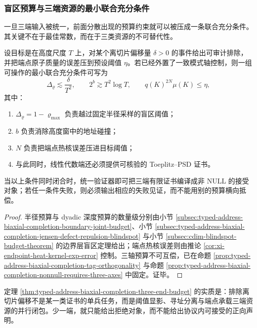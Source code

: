 \subsubsection{盲区预算与三端资源的最小联合充分条件}\label{subsubsec:typed-address-biaxial-completion-three-end-budget}
一旦三端输入被统一，前面分散出现的预算约束就可以被压成一条联合充分条件。其关键不在于最佳常数，而在于三类资源的不可替代性。

\begin{theorem}[三端证书的最小联合充分条件]\label{thm:typed-address-biaxial-completion-three-end-budget}
设目标是在高度尺度 \(T\) 上，对某个离切片偏移量 \(\delta>0\) 的事件给出可审计排除，并把端点原子质量的误差压到预设阈值 \(\eta\)。若已经外置了一致模式轴控制，则一组可操作的最小联合充分条件可写为
\[
\Delta_{\varrho}
\lesssim
\frac{\delta}{T^2},
\qquad
2^b
\gtrsim
T^2\log T,
\qquad
q(K)^{2N}\mu(K)\le \eta,
\]
其中：
\begin{enumerate}
  \item \(\Delta_{\varrho}=1-\varrho_{\max}\) 负责越过固定半径采样的盲区阈值；
  \item \(b\) 负责消除高度窗中的地址碰撞；
  \item \(N\) 负责把端点热核误差压进目标阈值；
  \item 与此同时，线性代数端还必须提供可核验的 Toeplitz--PSD 证书。
\end{enumerate}
当以上条件同时闭合时，统一验证器即可把三端有限证书编译成非 \(\mathrm{NULL}\) 的接受对象；若任一条件失败，则必须输出相应的失败见证，而不能用别的预算横向抵偿。
\end{theorem}
\begin{proof}
半径预算与 dyadic 深度预算的数量级分别由小节 \ref{subsec:typed-address-biaxial-completion-boundary-joint-budget}、小节 \ref{subsec:typed-address-biaxial-completion-jensen-defect-repulsion-blindspot} 与小节 \ref{subsec:cdim-blindspot-budget-theorem} 的边界层盲区定理给出；端点热核误差则由推论 \ref{cor:xi-endpoint-heat-kernel-exp-error} 控制。三轴预算不可互偿，已在命题 \ref{prop:typed-address-biaxial-completion-tag-orthogonality} 与命题 \ref{prop:typed-address-biaxial-completion-nonnull-requires-three-axes} 中固定。证毕。
\end{proof}

定理 \ref{thm:typed-address-biaxial-completion-three-end-budget} 的实质是：排除离切片偏移不是某一类证书的单兵任务，而是阈值显影、寻址分离与端点承载三端资源的并行闭包。少一端，就只能给出拒绝对象，而不能给出协议内可接受的正向声明。

